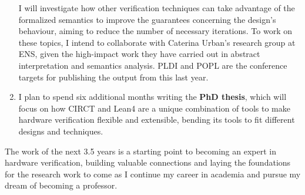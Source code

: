 \documentclass[sigconf,authorversion,nonacm, 11pt]{acmart}
\begin{document}
\begin{enumerate}
    I will investigate how other verification techniques can take advantage of the formalized semantics to improve the guarantees concerning the design's behaviour, aiming to reduce the number of necessary iterations. 
    To work on these topics, I intend to collaborate with Caterina Urban's research group at ENS, given the high-impact work they have carried out in abstract interpretation and semantics analysis. 
    PLDI and POPL are the conference targets for publishing the output from this last year. 
    \item I plan to spend six additional months writing the \textbf{PhD thesis}, which will focus on how CIRCT and Lean4 are a unique combination of tools to make hardware verification flexible and extensible, bending its tools to fit different designs and techniques.
\end{enumerate}
The work of the next 3.5 years is a starting point to becoming an expert in hardware verification, building valuable connections and laying the foundations for the research work to come as I continue my career in academia and pursue my dream of becoming a professor.

\thispagestyle{empty}


\thispagestyle{empty}
\end{document}
